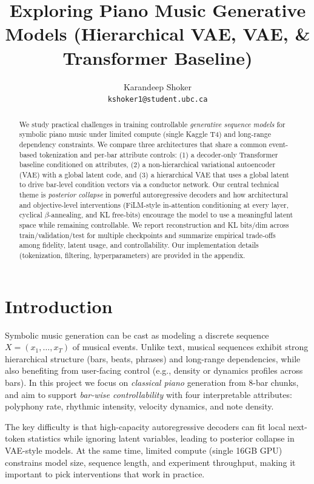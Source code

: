 \documentclass[10pt]{article}
\title{Exploring Piano Music Generative Models (Hierarchical VAE, VAE, \& Transformer Baseline)}
\author{Karandeep Shoker\\
\texttt{kshoker1@student.ubc.ca}}
\date{}
\begin{document}
\maketitle

\begin{abstract}
We study practical challenges in training controllable \emph{generative sequence models} for symbolic piano music under limited compute (single Kaggle T4) and long-range dependency constraints. We compare three architectures that share a common event-based tokenization and per-bar attribute controls: (1) a decoder-only Transformer baseline conditioned on attributes, (2) a non-hierarchical variational autoencoder (VAE) with a global latent code, and (3) a hierarchical VAE that uses a global latent to drive bar-level condition vectors via a conductor network. Our central technical theme is \emph{posterior collapse} in powerful autoregressive decoders and how architectural and objective-level interventions (FiLM-style in-attention conditioning at every layer, cyclical $\beta$-annealing, and KL free-bits) encourage the model to use a meaningful latent space while remaining controllable. We report reconstruction and KL bits/dim across train/validation/test for multiple checkpoints and summarize empirical trade-offs among fidelity, latent usage, and controllability. Our implementation details (tokenization, filtering, hyperparameters) are provided in the appendix.
\end{abstract}

\section{Introduction}
Symbolic music generation can be cast as modeling a discrete sequence $X=(x_1,\dots,x_T)$ of musical events. Unlike text, musical sequences exhibit strong hierarchical structure (bars, beats, phrases) and long-range dependencies, while also benefiting from user-facing control (e.g., density or dynamics profiles across bars). In this project we focus on \emph{classical piano} generation from 8-bar chunks, and aim to support \emph{bar-wise controllability} with four interpretable attributes: polyphony rate, rhythmic intensity, velocity dynamics, and note density.

The key difficulty is that high-capacity autoregressive decoders can fit local next-token statistics while ignoring latent variables, leading to posterior collapse in VAE-style models. At the same time, limited compute (single 16GB GPU) constrains model size, sequence length, and experiment throughput, making it important to pick interventions that work in practice.
\end{document}
